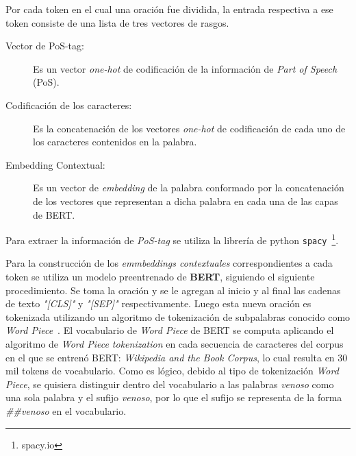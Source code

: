 Por cada token en el cual una oraci\'on fue dividida, la entrada respectiva a ese token consiste de una lista de tres vectores de rasgos.

\begin{description}
	\item[Vector de PoS-tag:] Es un vector \emph{one-hot} de codificaci\'on de la informaci\'on de \emph{Part of Speech} (PoS).
	\item[Codificaci\'on de los caracteres:] Es la concatenaci\'on de los vectores \emph{one-hot} de codificaci\'on de cada uno de los caracteres contenidos en la palabra. 
	\item[Embedding Contextual:] Es un vector de \emph{embedding} de la palabra conformado por la concatenaci\'on de los vectores que representan a dicha palabra en cada una de las capas de BERT.
	 
\end{description} 

Para extraer la informaci\'on de \emph{PoS-tag} se utiliza la librer\'ia de python \texttt{spacy}~\footnote{spacy.io}. 

Para la construcci\'on de los \emph{emmbeddings contextuales} correspondientes a cada token se utiliza un modelo preentrenado de \textbf{BERT}, siguiendo el siguiente procedimiento. Se toma la oraci\'on y se le agregan al inicio y al final las cadenas de texto \emph{"[CLS]"} y \emph{"[SEP]"} respectivamente. Luego esta nueva oraci\'on es tokenizada utilizando un algoritmo de tokenizaci\'on de subpalabras conocido como \emph{Word Piece}~\cite{schuster2012japanese}. El vocabulario de \emph{Word Piece} de BERT se computa aplicando el algoritmo de \emph{Word Piece tokenization} en cada secuencia de caracteres del corpus en el que se entren\'o BERT: \emph{Wikipedia and the Book Corpus}, lo cual resulta en 30 mil tokens de vocabulario. Como es l\'ogico, debido al tipo de tokenizaci\'on \emph{Word Piece}, se quisiera distinguir dentro del vocabulario a las palabras \emph{venoso} como una sola palabra y el sufijo \emph{venoso}, por lo que el sufijo se representa de la forma \emph{\#\#venoso} en el vocabulario.


